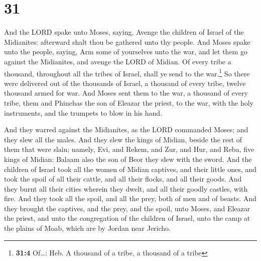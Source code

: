 \hypertarget{section-30}{%
\section{31}\label{section-30}}

 And the LORD spake unto Moses, saying, 
Avenge the children of Israel of the Midianites: afterward shalt thou be
gathered unto thy people.  And Moses spake unto the
people, saying, Arm some of yourselves unto the war, and let them go
against the Midianites, and avenge the LORD of Midian.  Of
every tribe a thousand, throughout all the tribes of Israel, shall ye
send to the war.\footnote{\textbf{31:4} Of\ldots: Heb. A thousand of a
  tribe, a thousand of a tribe}  So there were delivered
out of the thousands of Israel, a thousand of every tribe, twelve
thousand armed for war.  And Moses sent them to the war, a
thousand of every tribe, them and Phinehas the son of Eleazar the
priest, to the war, with the holy instruments, and the trumpets to blow
in his hand.

 And they warred against the Midianites, as the LORD
commanded Moses; and they slew all the males.  And they
slew the kings of Midian, beside the rest of them that were slain;
namely, Evi, and Rekem, and Zur, and Hur, and Reba, five kings of
Midian: Balaam also the son of Beor they slew with the sword.
 And the children of Israel took all the women of Midian
captives, and their little ones, and took the spoil of all their cattle,
and all their flocks, and all their goods.  And they
burnt all their cities wherein they dwelt, and all their goodly castles,
with fire.  And they took all the spoil, and all the
prey, both of men and of beasts.  And they brought the
captives, and the prey, and the spoil, unto Moses, and Eleazar the
priest, and unto the congregation of the children of Israel, unto the
camp at the plains of Moab, which are by Jordan near Jericho.

